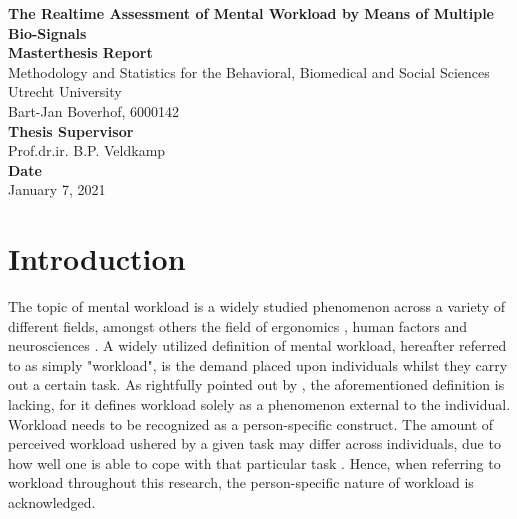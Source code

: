 \documentclass[12pt]{article}
\begin{document}
\begin{titlepage}
\begin{center}
\LARGE{\textbf{The Realtime Assessment of Mental Workload by Means of Multiple Bio-Signals}}\\
\vspace*{2\baselineskip}
\Large{\textbf{Masterthesis Report}}\\
Methodology and Statistics for the Behavioral, Biomedical and Social Sciences\\
\vspace*{1\baselineskip}
Utrecht University\\
\vspace*{4\baselineskip}
{Bart-Jan Boverhof, 6000142}\\
\vspace*{1\baselineskip}
{\textbf{Thesis Supervisor}}\\
Prof.dr.ir. B.P. Veldkamp\\
\vspace*{1\baselineskip}
{\textbf{Date}}\\
January 7, 2021\\
\vspace*{1\baselineskip}
\end{center}
\end{titlepage}

\section{Introduction}
The topic of mental workload is a widely studied phenomenon across a variety of different fields, amongst others the field of ergonomics \cite{young2015state}, human factors \cite{pretorius2007development} and neurosciences \cite{shuggi2017mental}. A widely utilized definition of mental workload, hereafter referred to as simply "workload", is the demand placed upon individuals whilst they carry out a certain task. As rightfully pointed out by , the aforementioned definition is lacking, for it defines workload solely as a phenomenon external to the individual. Workload needs to be recognized as a person-specific construct. The amount of perceived workload ushered by a given task may differ across individuals, due to how well one is able to cope with that particular task \cite{de1996measurement}. Hence, when referring to workload throughout this research, the person-specific nature of workload is acknowledged.
\end{document}
